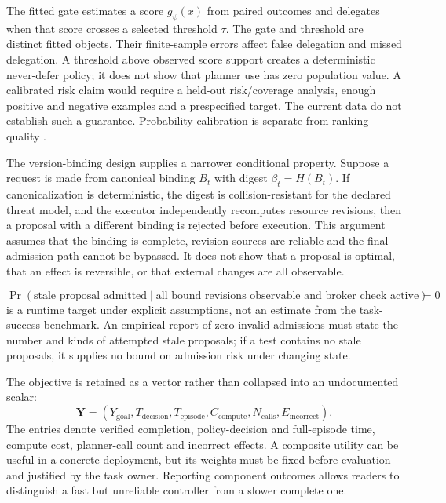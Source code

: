 \documentclass[11pt]{article}
\begin{document}
The fitted gate estimates a score $g_\psi(x)$ from paired outcomes and delegates when that score crosses a selected threshold $\tau$. The gate and threshold are distinct fitted objects. Their finite-sample errors affect false delegation and missed delegation. A threshold above observed score support creates a deterministic never-defer policy; it does not show that planner use has zero population value. A calibrated risk claim would require a held-out risk/coverage analysis, enough positive and negative examples and a prespecified target. The current data do not establish such a guarantee. Probability calibration is separate from ranking quality \cite{guo2017}.

The version-binding design supplies a narrower conditional property. Suppose a request is made from canonical binding $B_t$ with digest $\beta_t=H(B_t)$. If canonicalization is deterministic, the digest is collision-resistant for the declared threat model, and the executor independently recomputes resource revisions, then a proposal with a different binding is rejected before execution. This argument assumes that the binding is complete, revision sources are reliable and the final admission path cannot be bypassed. It does not show that a proposal is optimal, that an effect is reversible, or that external changes are all observable.

\begin{equation}
\Pr(\text{stale proposal admitted}\mid\text{all bound revisions observable and broker check active})=0
\end{equation}
is a runtime target under explicit assumptions, not an estimate from the task-success benchmark. An empirical report of zero invalid admissions must state the number and kinds of attempted stale proposals; if a test contains no stale proposals, it supplies no bound on admission risk under changing state.

The objective is retained as a vector rather than collapsed into an undocumented scalar:
\begin{equation}
\mathbf{Y}=(Y_{\mathrm{goal}},T_{\mathrm{decision}},T_{\mathrm{episode}},C_{\mathrm{compute}},N_{\mathrm{calls}},E_{\mathrm{incorrect}}).
\end{equation}
The entries denote verified completion, policy-decision and full-episode time, compute cost, planner-call count and incorrect effects. A composite utility can be useful in a concrete deployment, but its weights must be fixed before evaluation and justified by the task owner. Reporting component outcomes allows readers to distinguish a fast but unreliable controller from a slower complete one.
\end{document}
